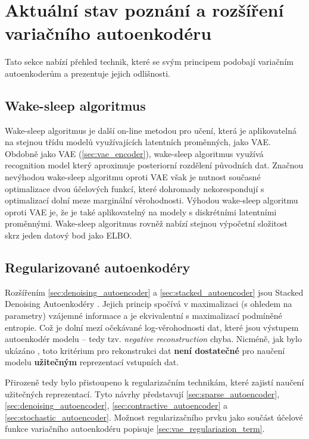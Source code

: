 \section{Aktuální stav poznání a rozšíření variačního autoenkodéru}
\label{sec:vae_extensions}
Tato sekce nabízí přehled technik, které se svým principem podobají variačním autoenkoderům a prezentuje jejich odlišnosti.
\subsection{Wake-sleep algoritmus}
Wake-sleep algoritmus \cite{Hinton1995} je další on-line metodou pro učení, která je aplikovatelná na stejnou třídu modelů využívajících latentních proměnných, jako VAE.
Obdobně jako VAE (\autoref{sec:vae_encoder}), wake-sleep algoritmus využívá recognition model který aproximuje posteriorní rozdělení původních dat.
Značnou nevýhodou wake-sleep algoritmu oproti VAE však je nutnost současné optimalizace dvou účelových funkcí, které dohromady nekorespondují s optimalizací dolní meze marginální věrohodnosti.
Výhodou wake-sleep algoritmu oproti VAE je, že je také aplikovatelný na modely s diskrétními latentními proměnnými.
Wake-sleep algoritmus rovněž nabízí stejnou výpočetní složitost skrz jeden datový bod jako ELBO. \cite{Kingma2019}

\subsection{Regularizované autoenkodéry}
Rozšířením \autoref{sec:denoising_autoencoder} a \autoref{sec:stacked_autoencoder} jsou Stacked Denoising Autoenkodéry \cite{Vincent2010}. Jejich princip spočívá v maximalizaci (s ohledem na parametry) vzájemné informace  a je ekvivalentní s maximalizací podmíněné entropie. Což je dolní mezí očekávané log-věrohodnosti dat, které jsou výstupem autoenkodér modelu – tedy tzv. \emph{negative reconstruction} chyba.
Nicméně, jak bylo ukázáno \cite{Bengio2014}, toto kritérium pro rekonstrukci dat \textbf{není dostatečné} pro naučení modelu \textbf{užitečným} reprezentací vstupních dat.

Přirozeně tedy bylo přistoupeno k regularizačním technikám, které zajistí naučení užitečných reprezentací. Tyto návrhy představují \autoref{sec:sparse_autoencoder}, \autoref{sec:denoising_autoencoder}, \autoref{sec:contractive_autoencoder} a \autoref{sec:stochastic_autoencoder}.
Možnost regularizačního prvku jako součást účelové funkce variačního autoenkodéru popisuje \autoref{sec:vae_regulariazion_term}.

